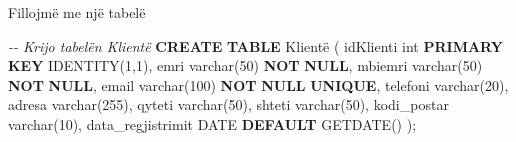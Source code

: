 \documentclass[
  ignorenonframetext,
]{beamer}
\newenvironment{Shaded}{\begin{snugshade}}{\end{snugshade}}
\newcommand{\CommentTok}[1]{\textcolor[rgb]{0.56,0.35,0.01}{\textit{#1}}}
\newcommand{\DataTypeTok}[1]{\textcolor[rgb]{0.13,0.29,0.53}{#1}}
\newcommand{\DecValTok}[1]{\textcolor[rgb]{0.00,0.00,0.81}{#1}}
\newcommand{\KeywordTok}[1]{\textcolor[rgb]{0.13,0.29,0.53}{\textbf{#1}}}
\newcommand{\NormalTok}[1]{#1}
\begin{document}
\begin{frame}[fragile]{Fillojmë me një tabelë}
\label{fillojmuxeb-me-njuxeb-tabeluxeb}

\begin{Shaded}
\begin{Highlighting}[]
\CommentTok{{-}{-} Krijo tabelën Klientë}
\KeywordTok{CREATE} \KeywordTok{TABLE}\NormalTok{ Klientë (}
\NormalTok{  idKlienti }\DataTypeTok{int} \KeywordTok{PRIMARY} \KeywordTok{KEY}\NormalTok{ IDENTITY(}\DecValTok{1}\NormalTok{,}\DecValTok{1}\NormalTok{),}
\NormalTok{  emri }\DataTypeTok{varchar}\NormalTok{(}\DecValTok{50}\NormalTok{) }\KeywordTok{NOT} \KeywordTok{NULL}\NormalTok{,}
\NormalTok{  mbiemri }\DataTypeTok{varchar}\NormalTok{(}\DecValTok{50}\NormalTok{) }\KeywordTok{NOT} \KeywordTok{NULL}\NormalTok{,}
\NormalTok{  email }\DataTypeTok{varchar}\NormalTok{(}\DecValTok{100}\NormalTok{) }\KeywordTok{NOT} \KeywordTok{NULL} \KeywordTok{UNIQUE}\NormalTok{,}
\NormalTok{  telefoni }\DataTypeTok{varchar}\NormalTok{(}\DecValTok{20}\NormalTok{),}
\NormalTok{  adresa }\DataTypeTok{varchar}\NormalTok{(}\DecValTok{255}\NormalTok{),}
\NormalTok{  qyteti }\DataTypeTok{varchar}\NormalTok{(}\DecValTok{50}\NormalTok{),}
\NormalTok{  shteti }\DataTypeTok{varchar}\NormalTok{(}\DecValTok{50}\NormalTok{),}
\NormalTok{  kodi\_postar }\DataTypeTok{varchar}\NormalTok{(}\DecValTok{10}\NormalTok{),}
\NormalTok{  data\_regjistrimit }\DataTypeTok{DATE} \KeywordTok{DEFAULT}\NormalTok{ GETDATE()}
\NormalTok{);}
\end{Highlighting}
\end{Shaded}
\end{frame}
\end{document}
